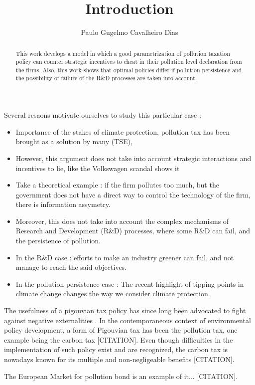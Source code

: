 \documentclass{article}
\title{Introduction}
\author{Paulo Gugelmo Cavalheiro Dias}
\begin{document}
\maketitle

\begin{abstract}
    This work develops a model in which a good parametrization of pollution taxation policy can counter strategic incentives to cheat in their pollution level declaration from the firms. Also, this work shows that optimal policies differ if pollution persistence and the possibility of failure of the R\&D processes are taken into account. 
\end{abstract}

Several resaons motivate ourselves to study this particular case : 
\begin{itemize}
    \item Importance of the stakes of climate protection, pollution tax has been brought as a solution by many (TSE),
    \item However, this argument does not take into account strategic interactions and incentives to lie, like the Volkswagen scandal shows it
    \item Take a theoretical example : if the firm pollutes too much, but the government does not have a direct way to control the technology of the firm, there is information assymetry. 
    \item Moreover, this does not take into account the complex mechanisms of Research and Development (R\&D) processes, where some R\&D can fail, and the persistence of pollution. 
    \item In the R\&D case : efforts to make an industry greener can fail, and not manage to reach the said objectives. 
    \item In the pollution persistence case : The recent highlight of tipping points in climate change changes the way we consider climate protection.
\end{itemize}
\pagebreak

The usefulness of a pigouvian tax policy has since long been advocated to fight against negative externalities \cite{Pigou1920}.
In the contemporaneous context of environmental policy development, a form of Pigouvian tax has been the pollution tax, one example being the carbon tax [CITATION]. 
Even though difficulties in the implementation of such policy exist and are recognized, the carbon tax is nowadays known for its multiple and non-negligeable benefits [CITATION].

The European Market for pollution bond is an example of it... [CITATION].
\end{document}
